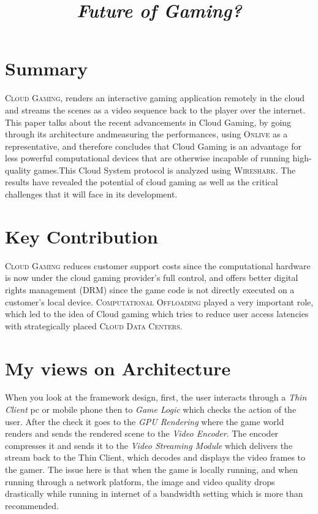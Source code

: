 \documentclass[12pt]{article}
\title{\huge{\textbf{\textit{Future of Gaming?}}}}
\author{}
\date{}
\begin{document}
\maketitle
\section*{Summary}
\hspace{1cm}
\textsc{Cloud Gaming}, renders an interactive gaming application remotely in the cloud and streams the scenes as a video sequence back to the player over the
internet. This paper talks about the recent advancements in Cloud Gaming, by going through its architecture and\newline measuring the performances, using \textsc{Onlive} as a representative, and therefore concludes that Cloud Gaming is an advantage for less powerful computational devices that are otherwise \newline incapable of running high-quality games.This Cloud System protocol is analyzed using \newline\textsc{Wireshark}. The results have revealed the potential of cloud gaming as well as the critical challenges that it will face in its development.

\section*{Key Contribution}
\hspace{1cm}
\textsc{Cloud Gaming} reduces customer support costs since the computational hardware is now under the cloud gaming provider’s full control,
and offers better digital rights management (DRM) since the game code is not directly executed on a customer’s local device. \newline\textsc{Computational Offloading} played a very important role, which led to the idea of Cloud gaming which tries to reduce user access latencies with strategically placed \textsc{Cloud Data Centers.}

\section*{My views on Architecture}
\hspace{1cm}
When you look at the framework design, first, the user interacts through a \textsl{Thin Client} pc or mobile phone then to \textsl{Game Logic} which checks the action of the user. After the check it goes to the \textsl{GPU Rendering} where the game world renders and sends the rendered scene to the \textsl{Video Encoder}. The encoder compresses it and sends it to the \textsl{Video Streaming Module} which delivers the stream back to the Thin Client, which decodes and displays the video frames to the gamer. The issue here is that when the game is locally running, and when running through a network platform, the image and video quality drops drastically while running in internet of a bandwidth setting which is more than recommended.
\end{document}
